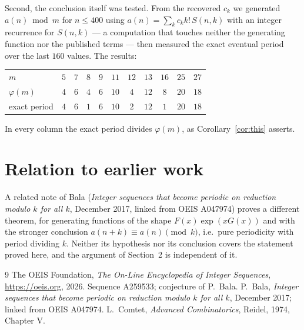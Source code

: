 \documentclass[11pt,a4paper]{article}
\theoremstyle{plain}
\theoremstyle{definition}
\begin{document}
Second, the conclusion itself was tested. From the recovered $c_{k}$ we generated
$a(n)\bmod m$ for $n\le400$ using $a(n)=\sum_{k}c_{k}k!\,S(n,k)$ with an integer
recurrence for $S(n,k)$ --- a computation that touches neither the generating function nor
the published terms --- then measured the exact eventual period over the last $160$
values. The results:

\begin{center}
\begin{tabular}{@{}lcccccccccc@{}}
\toprule
$m$  & $5$ & $7$ & $8$ & $9$ & $11$ & $12$ & $13$ & $16$ & $25$ & $27$\\
$\varphi(m)$  & $4$ & $6$ & $4$ & $6$ & $10$ & $4$ & $12$ & $8$ & $20$ & $18$\\
exact period  & $4$ & $6$ & $1$ & $6$ & $10$ & $2$ & $12$ & $1$ & $20$ & $18$\\
\bottomrule
\end{tabular}
\end{center}

\noindent
In every column the exact period divides $\varphi(m)$, as Corollary~\ref{cor:this}
asserts.

\section{Relation to earlier work}

A related note of Bala (\emph{Integer sequences that become periodic on reduction modulo
$k$ for all $k$}, December 2017, linked from OEIS A047974) proves a different theorem, for
generating functions of the shape $F(x)\exp(xG(x))$ and with the stronger conclusion
$a(n+k)\equiv a(n)\pmod{k}$, i.e.\ pure periodicity with period dividing $k$. Neither its
hypothesis nor its conclusion covers the statement proved here, and the argument of
Section~2 is independent of it.

\begin{thebibliography}{9}
 The OEIS Foundation, \emph{The On-Line Encyclopedia of Integer Sequences},
\url{https://oeis.org}, 2026. Sequence A259533; conjecture of P.\ Bala.
 P.\ Bala, \emph{Integer sequences that become periodic on reduction modulo
$k$ for all $k$}, December 2017; linked from OEIS A047974.
 L.\ Comtet, \emph{Advanced Combinatorics}, Reidel, 1974, Chapter V.
\end{thebibliography}
\end{document}

